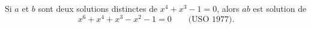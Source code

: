Si $a$ et $b$ sont deux solutions distinctes de $x^4 + x^3 - 1 = 0$, alors $ab$ est solution de
\[ x^6 + x^4 + x^3 - x^2 - 1 = 0 \qquad \text{(USO 1977).} \]
